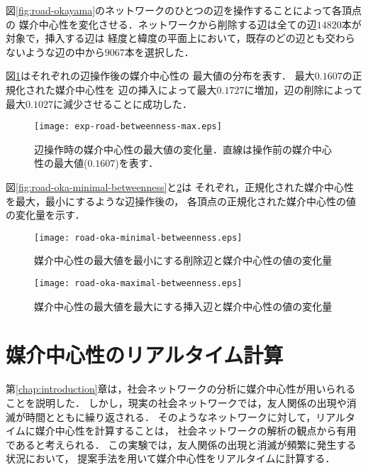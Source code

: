 図\ref{fig:road-okayama}のネットワークのひとつの辺を操作することによって各頂点の
媒介中心性を変化させる．ネットワークから削除する辺は全ての辺$14820$本が対象で，挿入する辺は
経度と緯度の平面上において，既存のどの辺とも交わらないような辺の中から$9067$本を選択した．

図\ref{fig:exp-road-betweenness-max}はそれぞれの辺操作後の媒介中心性の
最大値の分布を表す．
最大$0.1607$の正規化された媒介中心性を
辺の挿入によって最大$0.1727$に増加，辺の削除によって最大$0.1027$に減少させることに成功した．

\begin{figure}[tb]
  \centering
  \texttt{[image: exp-road-betweenness-max.eps]}
  \caption{辺操作時の媒介中心性の最大値の変化量．直線は操作前の媒介中心性の最大値($0.1607$)を表す．}
  \label{fig:exp-road-betweenness-max}
\end{figure}

図\ref{fig:road-oka-minimal-betweenness}と\ref{fig:road-oka-maximal-betweenness}は
それぞれ，正規化された媒介中心性を最大，最小にするような辺操作後の，
各頂点の正規化された媒介中心性の値の変化量を示す．

\begin{figure}[tb]
   \begin{minipage}{0.48\textwidth}
     \centering
     \texttt{[image: road-oka-minimal-betweenness.eps]}
     \caption{媒介中心性の最大値を最小にする削除辺と媒介中心性の値の変化量}
     \label{fig:road-oka-minimal-betweenness}
   \end{minipage}\hfill
   \begin{minipage}{0.48\textwidth}
     \centering
     \texttt{[image: road-oka-maximal-betweenness.eps]}
     \caption{媒介中心性の最大値を最大にする挿入辺と媒介中心性の値の変化量}
     \label{fig:road-oka-maximal-betweenness}
   \end{minipage}
\end{figure}

\section{媒介中心性のリアルタイム計算}

第\ref{chap:introduction}章は，社会ネットワークの分析に媒介中心性が用いられることを説明した．
しかし，現実の社会ネットワークでは，友人関係の出現や消滅が時間とともに繰り返される．
そのようなネットワークに対して，リアルタイムに媒介中心性を計算することは，
社会ネットワークの解析の観点から有用であると考えられる．
この実験では，友人関係の出現と消滅が頻繁に発生する状況において，
提案手法を用いて媒介中心性をリアルタイムに計算する．

